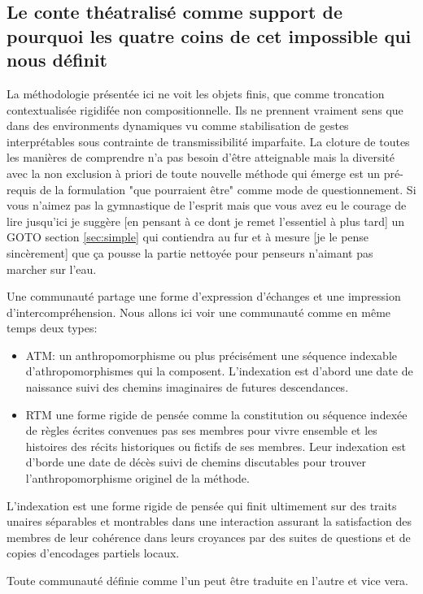 \documentclass{article}
\begin{document}
\subsection{ Le conte théatralisé comme support de pourquoi les quatre coins de cet impossible qui nous définit } 

La méthodologie présentée ici ne voit  les objets finis, que comme troncation contextualisée rigidifée non compositionnelle. Ils ne prennent vraiment sens que dans des environments dynamiques vu comme stabilisation de gestes interprétables sous contrainte de transmissibilité imparfaite. La cloture de toutes  les manières de comprendre n'a pas besoin d'être atteignable  mais la diversité avec la non exclusion à priori  de toute nouvelle méthode qui émerge est un pré-requis de la formulation "que pourraient être" comme mode de questionnement. Si vous n'aimez pas la gymnastique de l'esprit mais que vous avez eu le courage de lire jusqu'ici  je suggère [en pensant à ce dont je remet l'essentiel à plus tard] un GOTO section \ref{sec:simple} qui contiendra au fur et à mesure [je le pense sincèrement] que ça pousse la partie nettoyée pour penseurs n'aimant pas marcher sur l'eau.

Une communauté partage une forme d'expression d'échanges et une impression d'intercompréhension. Nous allons ici voir une communauté comme en même temps deux types:
\begin{itemize}
\item ATM: un anthropomorphisme ou plus précisément une séquence  indexable d'athropomorphismes qui la composent. L'indexation est d'abord une date de naissance suivi des chemins imaginaires de futures descendances. 
\item RTM une forme rigide de pensée comme la constitution ou séquence indexée de règles écrites convenues pas ses membres pour vivre ensemble et les histoires des récits historiques ou fictifs de ses membres. Leur indexation est d'borde une date de décès suivi de chemins discutables pour trouver l'anthropomorphisme originel de la méthode.
\end{itemize}

L'indexation est une forme rigide de pensée qui finit ultimement sur des traits unaires séparables et montrables dans une interaction assurant la satisfaction des membres de leur cohérence dans leurs croyances par des suites de questions et de copies d'encodages partiels locaux.
 

Toute communauté définie comme l'un peut être traduite en l'autre et vice vera.
\end{document}
